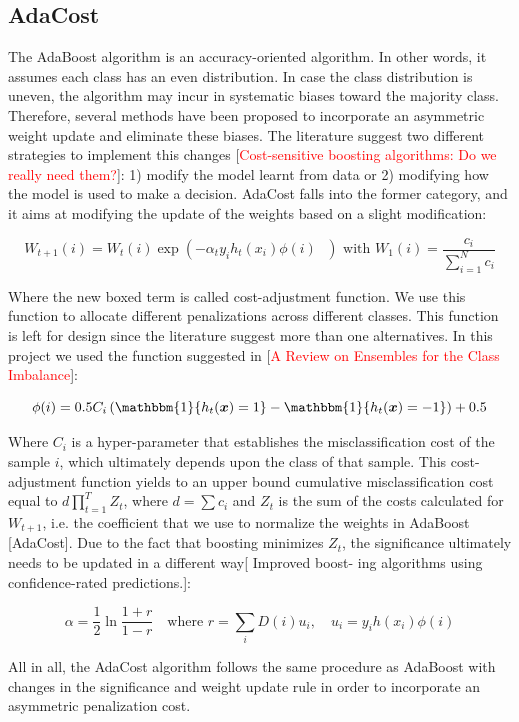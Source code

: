 \documentclass[conference]{IEEEtran}
\begin{document}
\subsection{AdaCost}
The AdaBoost algorithm is an accuracy-oriented algorithm. In other words, it assumes each class has an even distribution. In case the class distribution is uneven, the algorithm may incur in systematic biases toward the majority class. Therefore, several methods have been proposed to incorporate an asymmetric weight update and eliminate these biases. The literature suggest two different strategies to implement this changes [\textcolor{red}{Cost-sensitive boosting algorithms: Do we really need them?}]: 1) modify the model learnt from data or 2) modifying how the model is used to make a decision. AdaCost falls into the former category, and it aims at modifying the update of the weights based on a slight modification:

$$ W_{t+1}(i) = W_t(i) \exp \left(-\alpha_t y_i h_t(x_i) \boxed{\phi(i)} \text{ } \right) \text{  with  } W_1(i) = \frac{c_i}{\sum_{i=1}^Nc_i}$$

Where the new boxed term is called cost-adjustment function. We use this function to allocate different penalizations across different classes. This function is left for design since the literature suggest more than one alternatives. In this project we used the function suggested in [\textcolor{red}{A Review on Ensembles for the Class Imbalance}]: 

$$\phi(i) = 0.5C_i \left( \mathbbm{1}\{ h_t(\boldsymbol x)=1\} -  \mathbbm{1}\{ h_t(\boldsymbol x)=-1\} \right)+0.5$$

Where $C_i$ is a hyper-parameter that establishes the misclassification cost of the sample $i$, which ultimately depends upon the class of that sample. This cost-adjustment function yields to an upper bound cumulative misclassification cost equal to $d\prod_{t=1}^TZ_t$, where $d= \sum c_i$ and $Z_t$ is the sum of the costs calculated for $W_{t+1}$, i.e. the coefficient that we use to normalize the weights in AdaBoost [AdaCost]. Due to the fact that boosting minimizes $Z_t$, the significance ultimately needs to be updated in a different way[ Improved boost- ing algorithms using confidence-rated predictions.]:

$$ \alpha = \frac{1}{2}\ln\frac{1+r}{1-r}\quad \text{where } r=\sum_iD(i)u_i, \quad u_i=y_i h(x_i)\phi(i)$$

All in all, the AdaCost algorithm follows the same procedure as AdaBoost with changes in the significance and weight update rule in order to incorporate an asymmetric penalization cost. 
\end{document}
